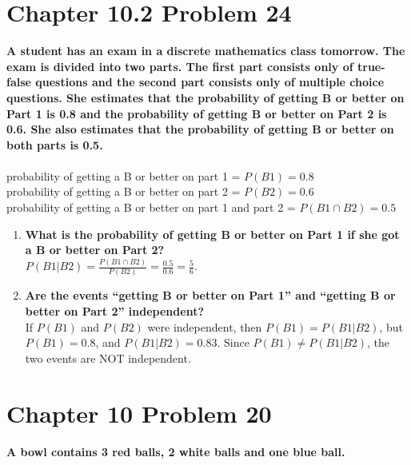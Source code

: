 \documentclass[10pt]{article}
\begin{document}
\section{Chapter 10.2 Problem 24}
\textbf{A student has an exam in a discrete mathematics class tomorrow. The exam is divided into two parts. The first part consists 
    only of true-false questions and the second part consists only of multiple choice questions. She estimates that the probability of 
    getting B or better on Part 1 is 0.8 and the probability of getting B or better on Part 2 is 0.6. She also estimates that the 
    probability of getting B or better on both parts is 0.5.} \\\\
    probability of getting a B or better on part 1 = $P(B1) = 0.8$ \\
    probability of getting a B or better on part 2 = $P(B2) = 0.6$ \\
    probability of getting a B or better on part 1 and part 2 = $P(B1 \cap B2) = 0.5$ 
\begin{enumerate}[label=(\alph*)]
    \item \textbf{What is the probability of getting B or better on Part 1 if she got a B or better on Part 2?} \\
        $P(B1 \vert B2) = \frac{P(B1 \cap B2)}{P(B2)} = \frac{0.5}{0.6} = \frac56$.

    \item \textbf{Are the events ``getting B or better on Part 1'' and ``getting B or better on Part 2'' independent?} \\
        If $P(B1)$ and $P(B2)$ were independent, then $P(B1) = P(B1 \vert B2)$, but $P(B1) = 0.8$, and $P(B1 \vert B2) = 0.83$.  Since
        $P(B1) \not= P(B1 \vert B2)$, the two events are NOT independent.
\end{enumerate}

\section{Chapter 10 Problem 20}
\textbf{A bowl contains 3 red balls, 2 white balls and one blue ball.}
\end{document}
